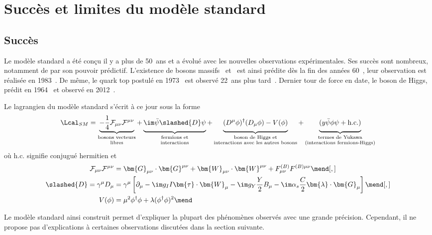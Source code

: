 \section{Succès et limites du modèle standard}\label{chapter-MS-MSSM-section-succes_limites}
\subsection{Succès}\label{chapter-MS-MSSM-section-succes_limites-subsec-succes}
Le modèle standard a été conçu il y a plus de 50~ans et a évolué avec les nouvelles observations expérimentales.
Ses succès sont nombreux, notamment de par son pouvoir prédictif.
L'existence de bosons massifs \Wboson\ et \Zboson\ est ainsi prédite dès la fin des années 60~\cite{Weinberg_leptons_model}, leur observation est réalisée en 1983~\cite{Wboson_discovery1,Wboson_discovery2,Wboson_discovery3,Zboson_discovery1,Zboson_discovery2}.
De même, le quark top postulé en 1973~\cite{CKM_KM} est observé 22~ans plus tard~\cite{top_discovery1,top_discovery2}.
Dernier tour de force en date, le boson de Higgs, prédit en 1964~\cite{Englert_Brout,Higgs_1,Higgs_2,Guralnik_Hagen_Kibble} et observé en 2012~\cite{ATLAS_Higgs_discovery,CMS_Higgs_discovery}.
\par Le lagrangien du modèle standard s'écrit à ce jour sous la forme
\begin{equation}
\Lcal_{SM} = 
\underbrace{- \frac{1}{4} \mathcal{F}_{\mu\nu}\mathcal{F}^{\mu\nu} \vphantom{\frac{1}{4}}}_{\substack{\text{bosons vecteurs\vphantom{YHg}}\\\text{libres\vphantom{(lHg)}}}}
+ \underbrace{\im \bar{\psi} \slashed{D} \psi \vphantom{\frac{1}{4}}}_{\substack{\text{fermions et\vphantom{YHg}}\\\text{interactions\vphantom{(lHg)}}}}
+ \underbrace{(D^\mu\phi)^\dagger(D_\mu\phi) - V(\phi) \vphantom{\frac{1}{4}}}_{\substack{\text{boson de Higgs et\vphantom{YHg}}\\\text{interactions avec les autres bosons\vphantom{(lHg)}}}}
+ \underbrace{(y \bar{\psi}\phi\psi + \text{h.c.}) \vphantom{\frac{1}{4}}}_{\substack{\text{termes de Yukawa\vphantom{YHg}}\\\text{(interactions fermions-Higgs)\vphantom{(lHg)}}}}
\label{eq-SM_lagrangian}
\end{equation}
où \og $\text{h.c.}$ \fg{} signifie conjugué hermitien et
\begin{align}
\mathcal{F}_{\mu\nu}\mathcal{F}^{\mu\nu} &= \bm{G}_{\mu\nu} \cdot \bm{G}^{\mu\nu} + \bm{W}_{\mu\nu} \cdot \bm{W}^{\mu\nu} + F^{(B)}_{\mu\nu} F^{(B)\mu\nu}
\mend[,]\\
\slashed{D} = \gamma^\mu D_\mu &= \gamma^\mu \left[ \partial_\mu - \im g_I I \bm{\tau}\cdot\bm{W}_\mu - \im g_Y \frac{Y}{2} B_\mu - \im \alpha_s \frac{C}{2} \bm{\lambda}\cdot\bm{G}_\mu \right]
\mend[,]\\
V(\phi) &= \mu^2\phi^\dagger\phi + \lambda (\phi^\dagger\phi)^2
\mend
\end{align}
\par Le modèle standard ainsi construit permet d'expliquer la plupart des phénomènes observés avec une grande précision.
Cependant, il ne propose pas d'explications à certaines observations discutées dans la section suivante.
